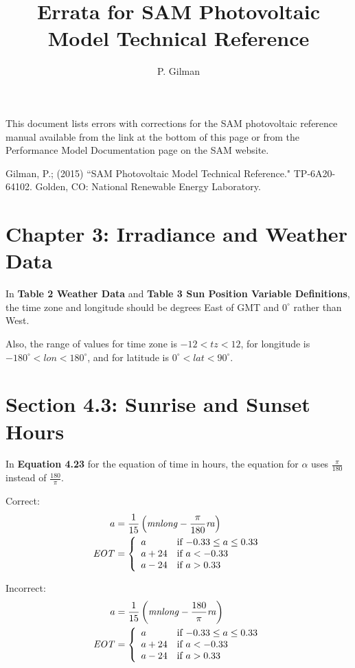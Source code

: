 \documentclass[report]{nrel}
\title{Errata for SAM Photovoltaic Model Technical Reference}
\author{P. Gilman}
\begin{document}
This document lists errors with corrections for the SAM photovoltaic reference manual available from the link at the bottom of this page or from the Performance Model Documentation page on the SAM website.

Gilman, P.; (2015) ``SAM Photovoltaic Model Technical Reference." TP-6A20-64102. Golden, CO: National Renewable Energy Laboratory.



\section*{Chapter 3: Irradiance and Weather Data}

In \textbf{Table 2 Weather Data} and \textbf{Table 3 Sun Position Variable Definitions}, the time zone and longitude should be degrees East of GMT and $0^\circ$ rather than West.

Also, the range of values for time zone is $-12 < \mathit{tz} < 12$, for longitude is $-180^\circ < \mathit{lon} < 180^\circ$, and for latitude is $ 0^\circ < \mathit{lat} < 90^\circ$.

\section*{Section 4.3: Sunrise and Sunset Hours}

In \textbf{Equation 4.23} for the equation of time in hours, the equation for $\alpha$ uses $\frac{\pi}{180}$ instead of $\frac{180}{\pi}$.

Correct:
\begin{align*}
a &= \frac{1}{15}\left(\mathit{mnlong} - \frac{\pi}{180}\mathit{ra}\right)\notag\\
\mathit{EOT} &= 
\left\{
   \begin{array}{ll}
     a & \text{if $-0.33 \leq a \leq 0.33$}\\
     a + 24 & \text{if $a<-0.33$}\\
     a - 24 & \text{if $a>0.33$}
   \end{array}
\right. 
\end{align*}

Incorrect:
\begin{align*}
a &= \frac{1}{15}\left(\mathit{mnlong} - \frac{180}{\pi}\mathit{ra}\right)\notag\\
\mathit{EOT} &= 
\left\{
   \begin{array}{ll}
     a & \text{if $-0.33 \leq a \leq 0.33$}\\
     a + 24 & \text{if $a<-0.33$}\\
     a - 24 & \text{if $a>0.33$}
   \end{array}
\right. 
\end{align*}
\end{document}
